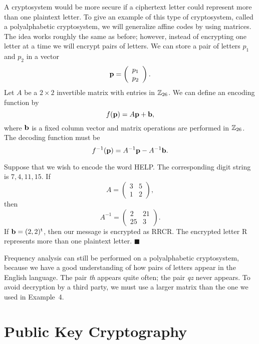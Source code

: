  
\medskip
 
 
A cryptosystem would be more secure if a ciphertext letter could
represent more than one plaintext letter.  To give an example of this
type of cryptosystem, called a {\bfi polyalphabetic
cryptosystem}, we will generalize
affine codes by using matrices. The idea works roughly the same as
before; however, instead of encrypting one letter at a time we will
encrypt pairs of letters.  We can store a pair of letters $p_1$ and
$p_2$ in a vector  
$$
{\bold p} = 
\left(
\begin{array}{c}
p_1 \\ p_2
\end{array}
\right).
$$
Let $A$ be a $2 \times 2$ invertible matrix
with entries in ${\Bbb Z}_{26}$. We can define an encoding function by
$$
f({\bold p}) = A {\bold p} + {\bold b} ,
$$
where ${\bold b}$ is a fixed column vector and matrix operations are
performed in ${\Bbb Z}_{26}$. The decoding function must be
$$
f^{-1}({\bold p}) = A^{-1} {\bold p} - A^{-1} {\bold b}.
$$
 
 
\medskip
 
 
Suppose that we wish to encode the word HELP. The corresponding
digit string is $7, 4, 11, 15$. If
$$
A =
\left(
\begin{array}{cc}
3 & 5 \\
1 & 2
\end{array}
\right),
$$
then
$$
A^{-1} 
=
\left(
\begin{array}{cc}
2 & 21 \\
25 & 3
\end{array}
\right).
$$
If ${\bold b} = ( 2, 2)^{\rm t}$, then our message is encrypted as
RRCR. The encrypted letter R represents more than one plaintext
letter. 
\hspace{\fill} $\blacksquare$ 
 
 
\medskip
 
 
Frequency analysis can still be performed on a polyalphabetic
cryptosystem, because we have a good understanding of how pairs of
letters appear in the English language. The pair {\em th} appears
quite often; the pair {\em qz} never appears.  To avoid decryption by
a third party, we must use a larger matrix than the one we used in
Example~4. 
  
 
 
\section{Public Key Cryptography}
 
